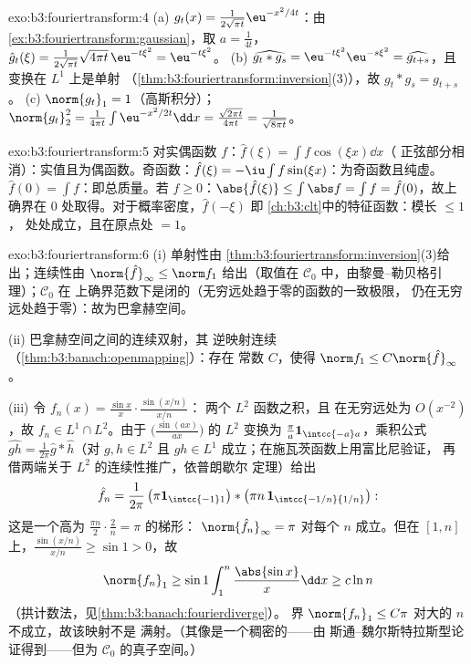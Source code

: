 \begin{solution}{exo:b3:fouriertransform:4}
(a) $g_t(x) = \frac1{2\sqrt{\pi t}}\eu^{-x^2/4t}$：由
\cref{ex:b3:fouriertransform:gaussian}，取 $a = \frac1{4t}$，
$\hat g_t(\xi) = \frac1{2\sqrt{\pi t}}\sqrt{4\pi
t}\,\eu^{-t\xi^2} = \eu^{-t\xi^2}$。
(b) $\widehat{g_t * g_s} = \eu^{-t\xi^2}\eu^{-s\xi^2} =
\widehat{g_{t+s}}$，且变换在 $L^1$ 上是单射
（\cref{thm:b3:fouriertransform:inversion}(3)），故 $g_t * g_s =
g_{t+s}$。
(c) $\norm{g_t}_1 = 1$（高斯积分）；
$\norm{g_t}_2^2 = \frac1{4\pi t}\int\eu^{-x^2/2t}\dd x =
\frac{\sqrt{2\pi t}}{4\pi t} = \frac1{\sqrt{8\pi t}}$。
\end{solution}

\begin{solution}{exo:b3:fouriertransform:5}
对实偶函数 $f$：$\hat f(\xi) = \int f\cos(\xi x)\dd x$（
正弦部分相消）：实值且为偶函数。奇函数：$\hat f(\xi) =
-\iu\int f\sin(\xi x)$：为奇函数且纯虚。$\hat f(0) =
\int f$：即总质量。若 $f \geq 0$：$\abs{\hat f(\xi)}
\leq \int\abs f = \int f = \hat f(0)$，故上确界在
$0$ 处取得。对于概率密度，$\hat f(-\xi)$ 即
\cref{ch:b3:clt}中的特征函数：模长 $\leq 1$，
处处成立，且在原点处 $= 1$。
\end{solution}

\begin{solution}{exo:b3:fouriertransform:6}
(i) 单射性由
\cref{thm:b3:fouriertransform:inversion}(3)给出；连续性由
$\norm{\hat f}_\infty \leq \norm f_1$ 给出（取值在
$\mathcal C_0$ 中，由黎曼–勒贝格引理）；$\mathcal C_0$ 在
上确界范数下是闭的（无穷远处趋于零的函数的一致极限，
仍在无穷远处趋于零）：故为巴拿赫空间。

(ii) 巴拿赫空间之间的连续双射，其
逆映射连续（\cref{thm:b3:banach:openmapping}）：存在
常数 $C$，使得 $\norm f_1 \leq C\norm{\hat f}_\infty$。

(iii) 令 $f_n(x) = \frac{\sin x}x\cdot\frac{\sin(x/n)}{x/n}$：
两个 $L^2$ 函数之积，且
在无穷远处为 $O(x^{-2})$，故 $f_n \in L^1\cap L^2$。由于
$\bigl(\frac{\sin(ax)}{ax}\bigr)$ 的 $L^2$ 变换为
$\frac\pi a\mathbf 1_{\intcc{-a}a}$，乘积公式
$\widehat{gh} = \frac1{2\pi}\hat g * \hat h$（对 $g, h
\in L^2$ 且 $gh \in L^1$ 成立；在施瓦茨函数上用富比尼验证，
再借两端关于 $L^2$ 的连续性推广，依普朗歇尔
定理）给出
\[
\hat f_n = \frac1{2\pi}\,\bigl(\pi\mathbf
1_{\intcc{-1}1}\bigr) * \bigl(\pi n\,\mathbf
1_{\intcc{-1/n}{1/n}}\bigr):
\]
这是一个高为 $\frac{\pi n}2\cdot\frac2n = \pi$ 的梯形：
$\norm{\hat f_n}_\infty = \pi$ 对每个 $n$ 成立。但在 $[1,
n]$ 上，$\frac{\sin(x/n)}{x/n} \geq \sin 1 > 0$，故
\[
\norm{f_n}_1 \geq \sin 1\int_1^n\frac{\abs{\sin x}}x\dd x
\geq c\ln n
\]
（拱计数法，见\cref{thm:b3:banach:fourierdiverge}）。
界 $\norm{f_n}_1 \leq C\pi$ 对大的 $n$ 不成立，故该映射不是
满射。（其像是一个稠密的——由
斯通–魏尔斯特拉斯型论证得到——但为
$\mathcal C_0$ 的真子空间。）
\end{solution}

